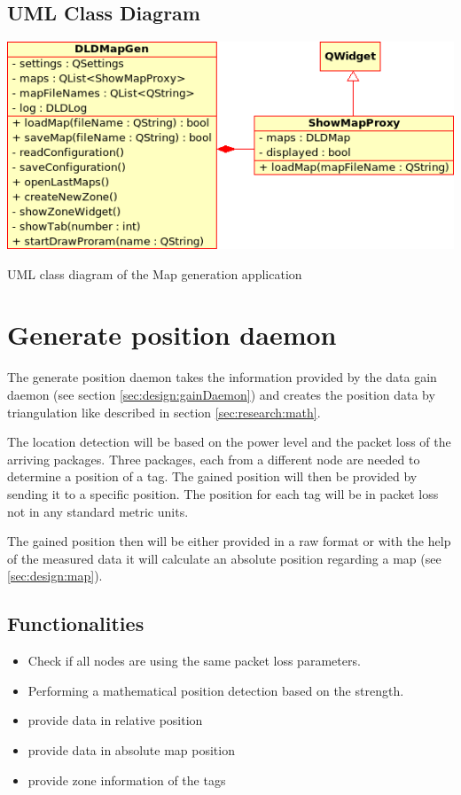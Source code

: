    \subsection{UML Class Diagram}
    \begin{staticFigure}
     \centering
     \includegraphics[scale=0.6]{UMLDiagrams/dldMapGen.png}
     \caption{UML class diagram of the Map generation application}
     \label{fg:projectModularization:mapGen}
    \end{staticFigure}

  \section{Generate position daemon}
   \label{sec:design:generatePositionDaemon}
    The generate position daemon takes the information provided by the data gain daemon (see section \ref{sec:design:gainDaemon}) and creates the position data by triangulation like described in section \ref{sec:research:math}.

    The location detection will be based on the power level and the packet loss of the arriving packages. Three packages, each from a different node are needed to determine a position of a tag. The gained position will then be provided by sending it to a specific position. The position for each tag will be in packet loss not in any standard metric units.

    The gained position then will be either provided in a raw format or with the help of the measured data it will calculate an absolute position regarding a map (see \ref{sec:design:map}).

   \subsection{Functionalities}
    \begin{itemize}
     \item Check if all nodes are using the same packet loss parameters.
     \item Performing a mathematical position detection based on the strength.
     \item provide data in relative position
     \item provide data in absolute map position
     \item provide zone information of the tags
    \end{itemize}

